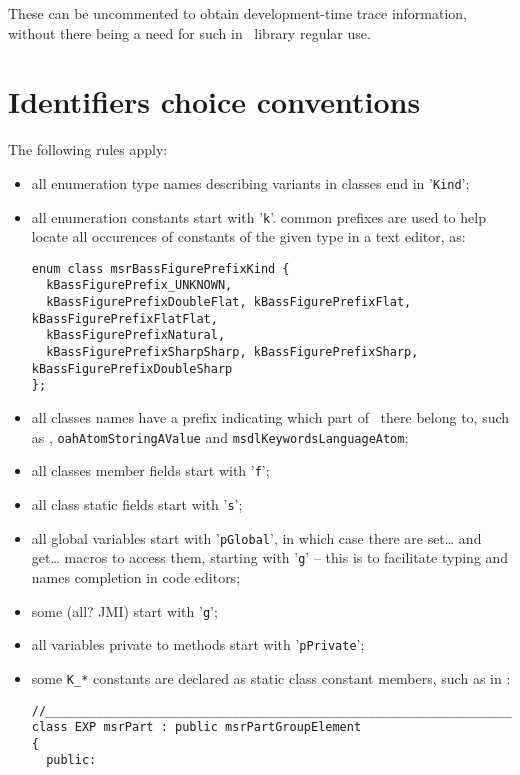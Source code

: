 These can be uncommented to obtain development-time trace information, without there being a need for such in \mf\ library regular use.


\section{Identifiers choice conventions}

The following rules apply:
\begin{itemize}

\item all enumeration type names describing variants in classes end in '{\tt Kind}';%
\item all enumeration constants start with '{\tt k}'. common prefixes are used to help locate all occurences of constants of the given type in a text editor, as:
\begin{lstlisting}[language=CPlusPlus]
enum class msrBassFigurePrefixKind {
  kBassFigurePrefix_UNKNOWN,
  kBassFigurePrefixDoubleFlat, kBassFigurePrefixFlat, kBassFigurePrefixFlatFlat,
  kBassFigurePrefixNatural,
  kBassFigurePrefixSharpSharp, kBassFigurePrefixSharp, kBassFigurePrefixDoubleSharp
};
\end{lstlisting}

\item all classes names have a prefix indicating which part of \mf\ there belong to, such as , {\tt oahAtomStoringAValue} and {\tt msdlKeywordsLanguageAtom};

\item all classes member fields start with '{\tt f}';

\item all class static fields start with '{\tt s}';

\item all global variables start with '{\tt pGlobal}', in which case there are {\code set\dots} and {\code get\dots} macros to access them, starting with '{\tt g}' -- this is to facilitate typing and names completion in code editors;
\item some (all? JMI) start with '{\tt g}';

\item all variables private to methods start with '{\tt pPrivate}';

\item some {\tt K_*} constants are declared as static class constant members, such as in :
\begin{lstlisting}[language=CPlusPlus]
//______________________________________________________________________________
class EXP msrPart : public msrPartGroupElement
{
  public:


\end{lstlisting}
\end{itemize}
